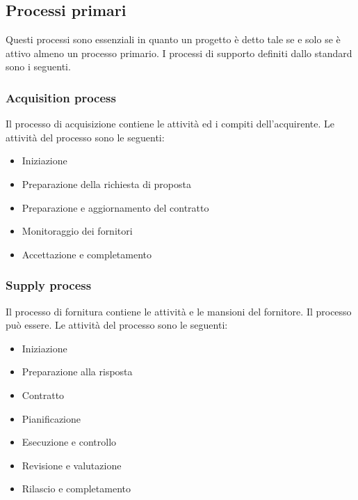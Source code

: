 \subsection{Processi primari}
Questi processi sono essenziali in quanto un progetto è detto tale se e solo se è attivo almeno un processo primario.
I processi di supporto definiti dallo standard sono i seguenti.
\subsubsection{Acquisition process}
Il processo di acquisizione contiene le attività ed i compiti dell'acquirente.
Le attività del processo sono le seguenti:
\begin{itemize}
\item Iniziazione
\item Preparazione della richiesta di proposta
\item Preparazione e aggiornamento del contratto
\item Monitoraggio dei fornitori
\item Accettazione e completamento
\end{itemize}

\subsubsection{Supply process}
Il processo di fornitura contiene le attività e le mansioni del fornitore. Il processo può essere.
Le attività del processo sono le seguenti:
\begin{itemize}
\item Iniziazione
\item Preparazione alla risposta
\item Contratto
\item Pianificazione
\item Esecuzione e controllo
\item Revisione e valutazione
\item Rilascio e completamento
\end{itemize}

